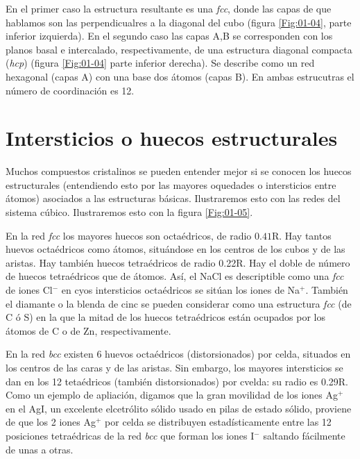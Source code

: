 En el primer caso la estructura resultante es una {\it fcc}, donde las capas de que hablamos son las perpendicualres a la diagonal del cubo (figura \ref{Fig:01-04}, parte inferior izquierda). En el segundo caso las capas A,B se corresponden con los planos basal e intercalado, respectivamente, de una estructura diagonal compacta ({\it hcp}) (figura \ref{Fig:01-04} parte inferior derecha). Se describe como un red hexagonal (capas A) con una base dos átomos (capas B). En ambas estrucutras el número de coordinación es 12.


\section{Intersticios o huecos estructurales}

Muchos compuestos cristalinos se pueden entender mejor si se conocen los huecos estructurales (entendiendo esto por las mayores oquedades o intersticios entre átomos) asociados a las estructuras básicas. Ilustraremos esto con las redes del sistema cúbico. Ilustraremos esto con la figura \ref{Fig:01-05}.

En la red \textit{fcc} los mayores huecos son octaédricos, de radio $0.41$R. Hay tantos huevos octaédricos como átomos, situándose en los centros de los cubos y de las aristas. Hay también huecos tetraédricos de radio 0.22R. Hay el doble de número de huecos tetraédricos que de átomos. Así, el NaCl es descriptible como una {\it fcc} de iones Cl$^-$ en cyos intersticios octaédricos se sitúan los iones de Na$^+$. También el diamante o la blenda de cinc se pueden considerar como una estructura {\it fcc} (de C ó S) en la que la mitad de los huecos tetraédricos están ocupados por los átomos de C o de Zn, respectivamente.

En la red {\it bcc} existen 6 huevos octaédricos (distorsionados) por celda, situados en los centros de las caras y de las aristas. Sin embargo, los mayores intersticios se dan en los 12 tetaédricos (también distorsionados) por cvelda: su radio es 0.29R. Como un ejemplo de apliación, digamos que la gran movilidad de los iones Ag$^+$ en el AgI, un excelente elcetrólito sólido usado en pilas de estado sólido, proviene de que los 2 iones Ag$^+$ por celda se distribuyen estadísticamente entre las 12 posiciones tetraédricas de la red {\it bcc} que forman los iones I$^-$ saltando fácilmente de unas a otras.


